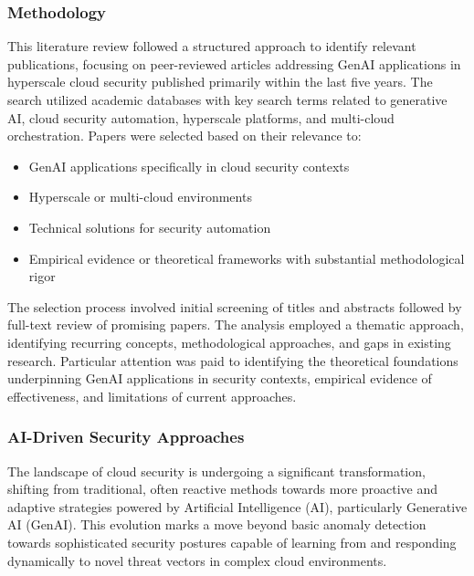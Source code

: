 \subsubsection{Methodology} %
\label{sec:Methodology}

This literature review followed a structured approach to identify relevant publications, focusing on peer-reviewed articles addressing GenAI applications in hyperscale cloud security published primarily within the last five years. The search utilized academic databases with key search terms related to generative AI, cloud security automation, hyperscale platforms, and multi-cloud orchestration.
Papers were selected based on their relevance to:

\begin{itemize}
\item GenAI applications specifically in cloud security contexts
\item Hyperscale or multi-cloud environments
\item Technical solutions for security automation
\item Empirical evidence or theoretical frameworks with substantial methodological rigor
\end{itemize}

The selection process involved initial screening of titles and abstracts followed by full-text review of promising papers. The analysis employed a thematic approach, identifying recurring concepts, methodological approaches, and gaps in existing research. Particular attention was paid to identifying the theoretical foundations underpinning GenAI applications in security contexts, empirical evidence of effectiveness, and limitations of current approaches.


\subsubsection{AI-Driven Security Approaches} %
\label{sec:AI-Driven Security Approaches}

The landscape of cloud security is undergoing a significant transformation, shifting from traditional, often reactive methods towards more proactive and adaptive strategies powered by Artificial Intelligence (AI), particularly Generative AI (GenAI). This evolution marks a move beyond basic anomaly detection towards sophisticated security postures capable of learning from and responding dynamically to novel threat vectors in complex cloud environments.

